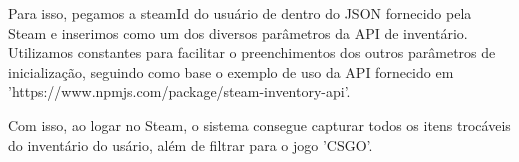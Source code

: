 \documentclass[a4paper,12pt]{article}
\begin{document}
    Para isso, pegamos a steamId do usuário de dentro do JSON fornecido pela Steam e inserimos como um dos diversos parâmetros da API de 
    inventário. Utilizamos constantes para facilitar o preenchimentos dos outros parâmetros de inicialização, seguindo como base o 
    exemplo de uso da API fornecido em 'https://www.npmjs.com/package/steam-inventory-api'.

    Com isso, ao logar no Steam, o sistema consegue capturar todos os itens trocáveis do inventário do usário, 
    além de filtrar para o jogo 'CSGO'.
\end{document}
